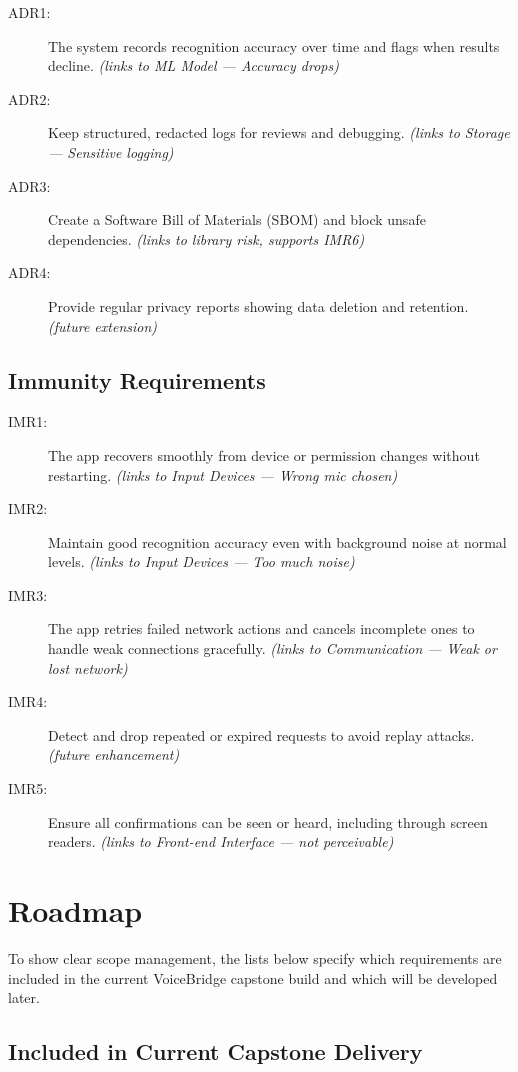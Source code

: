 \documentclass{article}
\begin{document}
\begin{description}
  \item[ADR1:] The system records recognition accuracy over time and flags when results decline. \emph{(links to ML Model — Accuracy drops)}
  \item[ADR2:] Keep structured, redacted logs for reviews and debugging. \emph{(links to Storage — Sensitive logging)}
  \item[ADR3:] Create a Software Bill of Materials (SBOM) and block unsafe dependencies. \emph{(links to library risk, supports IMR6)}
  \item[ADR4:] Provide regular privacy reports showing data deletion and retention. \emph{(future extension)}
\end{description}

\subsection{Immunity Requirements}

\begin{description}
  \item[IMR1:] The app recovers smoothly from device or permission changes without restarting. \emph{(links to Input Devices — Wrong mic chosen)}
  \item[IMR2:] Maintain good recognition accuracy even with background noise at normal levels. \emph{(links to Input Devices — Too much noise)}
  \item[IMR3:] The app retries failed network actions and cancels incomplete ones to handle weak connections gracefully. \emph{(links to Communication — Weak or lost network)}
  \item[IMR4:] Detect and drop repeated or expired requests to avoid replay attacks. \emph{(future enhancement)}
  \item[IMR5:] Ensure all confirmations can be seen or heard, including through screen readers. \emph{(links to Front-end Interface — not perceivable)}
\end{description}

\section{Roadmap}

To show clear scope management, the lists below specify which requirements are included in the current VoiceBridge capstone build and which will be developed later.

\subsection{Included in Current Capstone Delivery}
\end{document}
